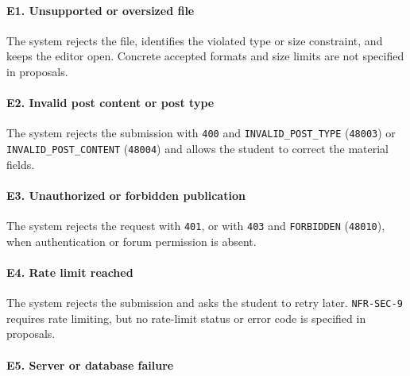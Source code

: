 \documentclass[12pt]{article}
\begin{document}
\hypertarget{sec:e1-unsupported-or-oversized-file}{}
\paragraph*{E1. Unsupported or oversized file}
\par\medskip

The system rejects the file, identifies the violated type or size constraint, and keeps the editor open. Concrete accepted formats and size limits are not specified in proposals.
\par\medskip

\hypertarget{sec:e2-invalid-post-content-or-post-type}{}
\paragraph*{E2. Invalid post content or post type}
\par\medskip

The system rejects the submission with \texttt{400} and \texttt{INVALID\_POST\_TYPE} (\texttt{48003}) or \texttt{INVALID\_POST\_CONTENT} (\texttt{48004}) and allows the student to correct the material fields.
\par\medskip

\hypertarget{sec:e3-unauthorized-or-forbidden-publication}{}
\paragraph*{E3. Unauthorized or forbidden publication}
\par\medskip

The system rejects the request with \texttt{401}, or with \texttt{403} and \texttt{FORBIDDEN} (\texttt{48010}), when authentication or forum permission is absent.
\par\medskip

\hypertarget{sec:e4-rate-limit-reached}{}
\paragraph*{E4. Rate limit reached}
\par\medskip

The system rejects the submission and asks the student to retry later. \texttt{NFR-SEC-9} requires rate limiting, but no rate-limit status or error code is specified in proposals.
\par\medskip

\hypertarget{sec:e5-server-or-database-failure}{}
\paragraph*{E5. Server or database failure}
\par\medskip
\end{document}
